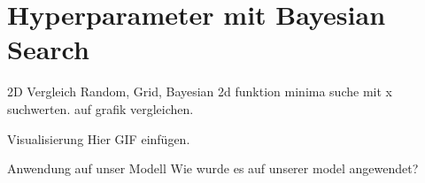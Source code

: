 \section{Hyperparameter mit Bayesian Search}


\begin{frame}{2D Vergleich Random, Grid, Bayesian}
    2d funktion minima suche mit x suchwerten. auf grafik vergleichen.
\end{frame}







    


\begin{frame}{Visualisierung}
    Hier GIF einfügen.
\end{frame}


\begin{frame}[fragile]{Anwendung auf unser Modell}
Wie wurde es auf unserer model angewendet?
\end{frame}